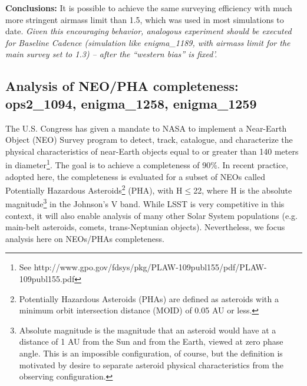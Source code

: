 \documentclass[manuscript]{article}
\begin{document}
{\bf Conclusions:}  It is possible to achieve the same surveying efficiency with 
much more stringent airmass limit than 1.5, which was used in most simulations
to date.  {\it Given this encouraging behavior, analogous experiment should be 
executed for Baseline Cadence (simulation like enigma\_1189, with airmass limit
for the main survey set to 1.3) -- after the ``western bias'' is fixed'.} 



\subsection{Analysis of NEO/PHA completeness:   ops2\_1094, enigma\_1258, enigma\_1259 \label{sec:NEOs}} 

The U.S. Congress has given a mandate to NASA to implement a Near-Earth Object (NEO) Survey 
program to detect, track, catalogue, and characterize the physical characteristics of near-Earth objects 
equal to or greater than 140 meters in diameter\footnote{See http://www.gpo.gov/fdsys/pkg/PLAW-109publ155/pdf/PLAW-109publ155.pdf}. The goal is 
to achieve a completeness of 90\%. In recent practice, adopted here, the completeness is evaluated for 
a subset of NEOs called Potentially Hazardous Asteroids\footnote{
Potentially Hazardous Asteroids (PHAs) are defined as asteroids with a minimum orbit intersection 
distance (MOID) of 0.05 AU or less.}  (PHA), with H$\le$22, where H is the absolute 
magnitude\footnote{Absolute magnitude is the magnitude that an asteroid would have at a distance of 
1 AU from the Sun and from the Earth, viewed at zero phase angle. This is an impossible configuration, 
of course, but the definition is motivated by desire to separate asteroid physical characteristics from 
the observing configuration.} in the Johnson's V band. While LSST is very competitive in this context, 
it will also enable analysis of many other Solar System populations (e.g. main-belt asteroids, comets,
trans-Neptunian objects). Nevertheless, we focus analysis here on NEOs/PHAs completeness. 
\end{document}
